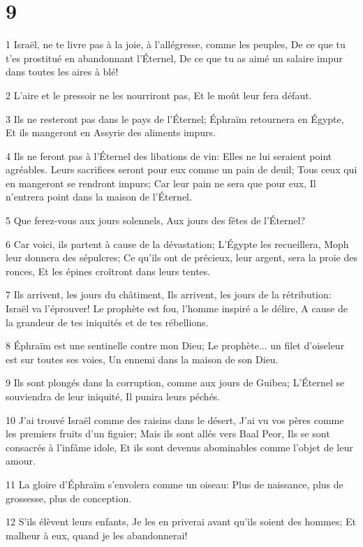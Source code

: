\chapter{9}

\par 1 Israël, ne te livre pas à la joie, à l'allégresse, comme les peuples, De ce que tu t'es prostitué en abandonnant l'Éternel, De ce que tu as aimé un salaire impur dans toutes les aires à blé!
\par 2 L'aire et le pressoir ne les nourriront pas, Et le moût leur fera défaut.
\par 3 Ils ne resteront pas dans le pays de l'Éternel; Éphraïm retournera en Égypte, Et ils mangeront en Assyrie des aliments impurs.
\par 4 Ils ne feront pas à l'Éternel des libations de vin: Elles ne lui seraient point agréables. Leurs sacrifices seront pour eux comme un pain de deuil; Tous ceux qui en mangeront se rendront impurs; Car leur pain ne sera que pour eux, Il n'entrera point dans la maison de l'Éternel.
\par 5 Que ferez-vous aux jours solennels, Aux jours des fêtes de l'Éternel?
\par 6 Car voici, ils partent à cause de la dévastation; L'Égypte les recueillera, Moph leur donnera des sépulcres; Ce qu'ils ont de précieux, leur argent, sera la proie des ronces, Et les épines croîtront dans leurs tentes.
\par 7 Ils arrivent, les jours du châtiment, Ils arrivent, les jours de la rétribution: Israël va l'éprouver! Le prophète est fou, l'homme inspiré a le délire, A cause de la grandeur de tes iniquités et de tes rébellions.
\par 8 Éphraïm est une sentinelle contre mon Dieu; Le prophète... un filet d'oiseleur est sur toutes ses voies, Un ennemi dans la maison de son Dieu.
\par 9 Ils sont plongés dans la corruption, comme aux jours de Guibea; L'Éternel se souviendra de leur iniquité, Il punira leurs péchés.
\par 10 J'ai trouvé Israël comme des raisins dans le désert, J'ai vu vos pères comme les premiers fruits d'un figuier; Mais ils sont allés vers Baal Peor, Ils se sont consacrés à l'infâme idole, Et ils sont devenus abominables comme l'objet de leur amour.
\par 11 La gloire d'Éphraïm s'envolera comme un oiseau: Plus de naissance, plus de grossesse, plus de conception.
\par 12 S'ils élèvent leurs enfants, Je les en priverai avant qu'ils soient des hommes; Et malheur à eux, quand je les abandonnerai!

